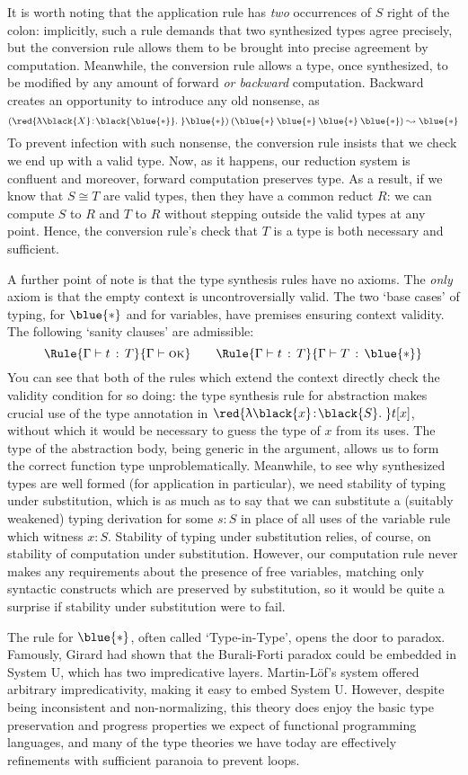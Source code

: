\documentclass[natbib]{article}
\newcommand{\type}{\blue{\ast}}
\newcommand{\hb}{\!:\!}
\newcommand{\LT}[2]{\red{\uplambda\black{#1}\hb \black{#2}.\;}}
\newcommand{\conv}{\cong}
\newcommand{\VALID}[1]{#1 \vdash \textsc{ok}}
\newcommand{\MLSYN}[3]{#1 \vdash #2 \,:\, #3}
\begin{document}
It is worth noting that the application rule has \emph{two} occurrences of $S$ right of the colon: implicitly, such a rule demands that two synthesized types agree precisely, but the conversion rule allows them to be brought into precise agreement by computation. Meanwhile, the conversion rule allows a type, once synthesized, to be modified by any amount of forward \emph{or backward} computation. Backward creates an opportunity to introduce
any old nonsense, as
\[
  (\LT X\type \type)\:(\type\:\type\:\type\:\type) \leadsto \type
\]
To prevent infection with such nonsense, the conversion rule insists that we check we end up with a valid type.
Now, as it happens, our reduction system is confluent and moreover, forward computation preserves type. As a result, if we know that $S \conv T$ are valid types, then they have a common reduct $R$: we can compute $S$ to $R$ and $T$ to $R$ without stepping outside the valid types at any point. Hence, the conversion rule's check
that $T$ is a type is both necessary and sufficient.

A further point of note is that the type synthesis rules have no axioms. The \emph{only} axiom is that the empty context is uncontroversially valid. The two `base cases' of typing, for $\type$ and for variables, have premises ensuring context validity. The following `sanity clauses' are admissible:
\[
\Rule{\MLSYN\Gamma tT}{\VALID\Gamma}
\qquad
\Rule{\MLSYN\Gamma tT}{\MLSYN\Gamma T\type}
\]
You can see that both of the rules which extend the context directly check the validity condition for so doing: the type synthesis rule for abstraction makes crucial use of the type annotation in $\LT xS t[x]$, without which it would be necessary to guess the type of $x$ from its uses. The type of the abstraction body, being generic
in the argument, allows us to form the correct function type unproblematically.
Meanwhile, to see why synthesized types are well formed (for application in particular), we need stability of typing under substitution, which is as much as to say that we can substitute a (suitably weakened) typing derivation for some $s:S$ in place of all uses of the variable rule which witness $x:S$. Stability of typing
under substitution relies, of course, on stability of computation under substitution. However, our computation
rule never makes any requirements about the presence of free variables, matching only syntactic constructs which are preserved by substitution, so it would be quite a surprise if stability under substitution were to fail.


The rule for $\type$, often called `Type-in-Type', opens the door to paradox. Famously, Girard had shown that the Burali-Forti paradox could be embedded in System U, which has two impredicative layers. Martin-L\"of's system offered arbitrary impredicativity, making it easy to embed System U. However, despite being inconsistent and non-normalizing, this theory does enjoy the basic type preservation and progress properties we expect of functional programming languages, and many of the type theories we have today are effectively refinements with sufficient paranoia to prevent loops.
\end{document}

